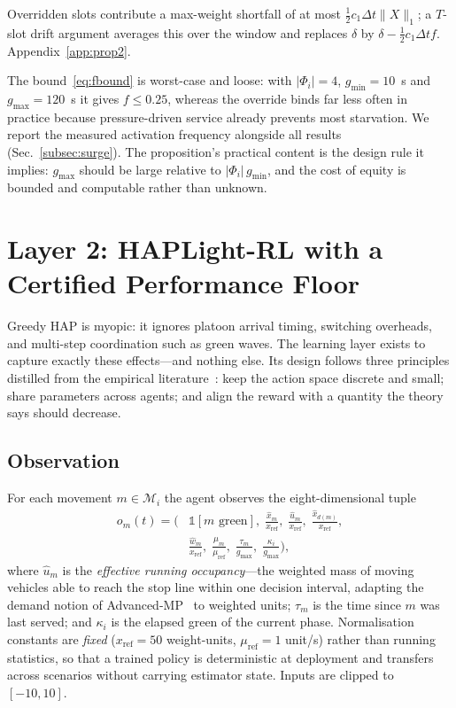 \documentclass[journal]{IEEEtran}
\newcommand{\Mset}{\mathcal{M}}
\begin{document}
\begin{IEEEproof}
Overridden slots contribute a max-weight shortfall of at most
$\tfrac12 c_1 \Delta t \|X\|_1$; a $T$-slot drift argument averages this
over the window and replaces $\delta$ by $\delta - \tfrac12 c_1\Delta t f$.
Appendix~\ref{app:prop2}.
\end{IEEEproof}

The bound~\eqref{eq:fbound} is worst-case and loose: with $|\Phi_i|=4$,
$g_{\min}=10$~s and $g_{\max}=120$~s it gives $f \le 0.25$, whereas the
override binds far less often in practice because pressure-driven service
already prevents most starvation. We report the measured activation
frequency alongside all results (Sec.~\ref{subsec:surge}). The
proposition's practical content is the design rule it implies:
$g_{\max}$ should be large relative to $|\Phi_i|\,g_{\min}$, and the
cost of equity is bounded and computable rather than unknown.

\section{Layer 2: HAPLight-RL with a Certified Performance Floor}
\label{sec:rl}
Greedy HAP is myopic: it ignores platoon arrival timing, switching
overheads, and multi-step coordination such as green waves. The learning
layer exists to capture exactly these effects---and nothing else. Its
design follows three principles distilled from the empirical
literature~\cite{b_mplight,b_advxlight,b_resco}: keep the action space
discrete and small; share parameters across agents; and align the reward
with a quantity the theory says should decrease.

\subsection{Observation}
\label{subsec:obs}
For each movement $m \in \Mset_i$ the agent observes the eight-dimensional
tuple
\begin{equation}
\begin{aligned}
o_m(t) = \Big(&
 \mathbb{1}[m \text{ green}],\;
 \tfrac{\hat{x}_m}{x_{\mathrm{ref}}},\;
 \tfrac{\hat{u}_m}{x_{\mathrm{ref}}},\;
 \tfrac{\hat{x}_{d(m)}}{x_{\mathrm{ref}}},\\[-1pt]
 &\tfrac{\hat{w}_m}{x_{\mathrm{ref}}},\;
 \tfrac{\mu_m}{\mu_{\mathrm{ref}}},\;
 \tfrac{\tau_m}{g_{\max}},\;
 \tfrac{\kappa_i}{g_{\max}}\Big),
\end{aligned}
\label{eq:obs}
\end{equation}
where $\hat{u}_m$ is the \emph{effective running occupancy}---the
weighted mass of moving vehicles able to reach the stop line within one
decision interval, adapting the demand notion of
Advanced-MP~\cite{b_advxlight} to weighted units; $\tau_m$ is the time
since $m$ was last served; and $\kappa_i$ is the elapsed green of the
current phase. Normalisation constants are \emph{fixed}
($x_{\mathrm{ref}}=50$ weight-units, $\mu_{\mathrm{ref}}=1$
unit/s) rather than running statistics, so that a trained policy is
deterministic at deployment and transfers across scenarios without
carrying estimator state. Inputs are clipped to $[-10,10]$.
\end{document}

